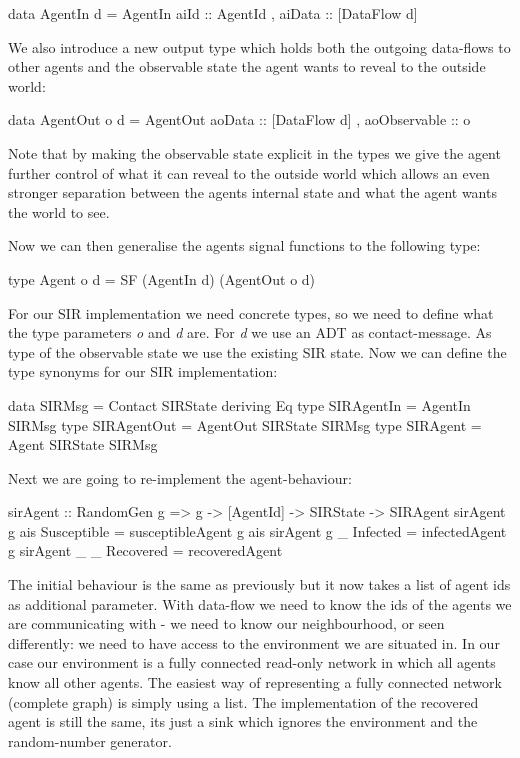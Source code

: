 \begin{HaskellCode}
data AgentIn d = AgentIn
  { aiId   :: AgentId
  , aiData :: [DataFlow d] } 
\end{HaskellCode}

We also introduce a new output type which holds both the outgoing data-flows to other agents and the observable state the agent wants to reveal to the outside world:

\begin{HaskellCode}
data AgentOut o d = AgentOut
  { aoData        :: [DataFlow d]
  , aoObservable  :: o }
\end{HaskellCode}

Note that by making the observable state explicit in the types we give the agent further control of what it can reveal to the outside world which allows an even stronger separation between the agents internal state and what the agent wants the world to see.

Now we can then generalise the agents signal functions to the following type:
\begin{HaskellCode}
type Agent o d = SF (AgentIn d) (AgentOut o d)
\end{HaskellCode}

For our SIR implementation we need concrete types, so we need to define what the type parameters \textit{o} and \textit{d} are. For \textit{d} we use an ADT as contact-message. As type of the observable state we use the existing SIR state. Now we can define the type synonyms for our SIR implementation:
\begin{HaskellCode}
data SIRMsg      = Contact SIRState deriving Eq
type SIRAgentIn  = AgentIn SIRMsg
type SIRAgentOut = AgentOut SIRState SIRMsg
type SIRAgent    = Agent SIRState SIRMsg
\end{HaskellCode}

Next we are going to re-implement the agent-behaviour:

\begin{HaskellCode}
sirAgent :: RandomGen g => g -> [AgentId] -> SIRState -> SIRAgent
sirAgent g ais Susceptible = susceptibleAgent g ais
sirAgent g _   Infected    = infectedAgent g
sirAgent _ _   Recovered   = recoveredAgent
\end{HaskellCode}

The initial behaviour is the same as previously but it now takes a list of agent ids as additional parameter. With data-flow we need to know the ids of the agents we are communicating with - we need to know our neighbourhood, or seen differently: we need to have access to the environment we are situated in. In our case our environment is a fully connected read-only network in which all agents know all other agents. The easiest way of representing a fully connected network (complete graph) is simply using a list. 
The implementation of the recovered agent is still the same, its just a sink which ignores the environment and the random-number generator. 


